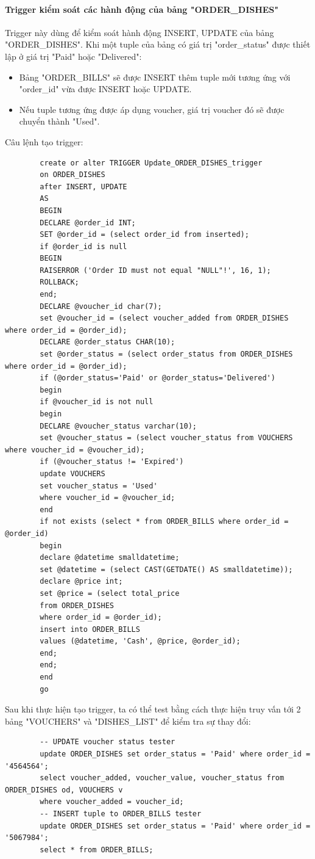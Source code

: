 \documentclass[13pt,a4paper]{article}
\begin{document}
	\paragraph{Trigger kiểm soát các hành động của bảng "ORDER\_DISHES"\\}
	Trigger này dùng để kiểm soát hành động INSERT, UPDATE của bảng "ORDER\_DISHES". Khi một tuple của bảng có giá trị "order\_status" được thiết lập ở giá trị "Paid" hoặc "Delivered":
	\begin{itemize}
		\item Bảng "ORDER\_BILLS" sẽ được INSERT thêm tuple mới tương ứng với "order\_id" vừa được INSERT hoặc UPDATE.
		\item Nếu tuple tương ứng được áp dụng voucher, giá trị voucher đó sẽ được chuyển thành "Used".
	\end{itemize}
	Câu lệnh tạo trigger:
	\begin{lstlisting}
		create or alter TRIGGER Update_ORDER_DISHES_trigger
		on ORDER_DISHES
		after INSERT, UPDATE
		AS
		BEGIN
		DECLARE @order_id INT;
		SET @order_id = (select order_id from inserted);
		if @order_id is null
		BEGIN
		RAISERROR ('Order ID must not equal "NULL"!', 16, 1);
		ROLLBACK;
		end;
		DECLARE @voucher_id char(7);
		set @voucher_id = (select voucher_added from ORDER_DISHES where order_id = @order_id);
		DECLARE @order_status CHAR(10);
		set @order_status = (select order_status from ORDER_DISHES where order_id = @order_id);
		if (@order_status='Paid' or @order_status='Delivered')
		begin
		if @voucher_id is not null
		begin
		DECLARE @voucher_status varchar(10);
		set @voucher_status = (select voucher_status from VOUCHERS where voucher_id = @voucher_id);
		if (@voucher_status != 'Expired')
		update VOUCHERS
		set voucher_status = 'Used'
		where voucher_id = @voucher_id;
		end
		if not exists (select * from ORDER_BILLS where order_id = @order_id)
		begin
		declare @datetime smalldatetime;
		set @datetime = (select CAST(GETDATE() AS smalldatetime));
		declare @price int;
		set @price = (select total_price
		from ORDER_DISHES
		where order_id = @order_id);
		insert into ORDER_BILLS
		values (@datetime, 'Cash', @price, @order_id);
		end;
		end;
		end
		go
	\end{lstlisting}
	Sau khi thực hiện tạo trigger, ta có thể test bằng cách thực hiện truy vấn tới 2 bảng "VOUCHERS" và "DISHES\_LIST" để kiểm tra sự thay đổi:
	\begin{lstlisting}
		-- UPDATE voucher status tester
		update ORDER_DISHES set order_status = 'Paid' where order_id = '4564564';
		select voucher_added, voucher_value, voucher_status from ORDER_DISHES od, VOUCHERS v
		where voucher_added = voucher_id;
		-- INSERT tuple to ORDER_BILLS tester
		update ORDER_DISHES set order_status = 'Paid' where order_id = '5067984';
		select * from ORDER_BILLS;
	\end{lstlisting}
\end{document}
